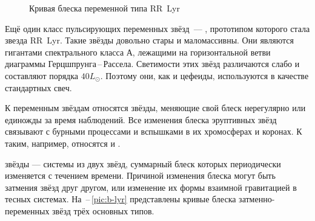 \begin{wrapfigure}[11]{r}{0.47\tw}
    \centering
    \vspace{-1.2pc}
    \caption{Кривая блеска переменной типа RR~Lyr} %
    \label{pic:light-curve-rr-lyr}
\end{wrapfigure}
Ещё один класс пульсирующих переменных звёзд~--- , прототипом которого стала звезда RR~Lyr. Такие звёзды довольно стары и маломассивны. Они являются гигантами спектрального класса А, лежащими на горизонтальной ветви диаграммы Герцшпрунга\,--\,Рассела. Светимости этих звёзд различаются слабо и составляют порядка $40L_\odot$. Поэтому они, как и цефеиды, используются в качестве стандартных свеч.

К  переменным звёздам относятся звёзды, меняющие свой блеск нерегулярно или единожды за время наблюдений. Все изменения блеска эруптивных звёзд связывают с бурными процессами и вспышками в их хромосферах и коронах. К таким, например, относятся  и .

 звёзды --- системы из двух звёзд, суммарный блеск которых периодически изменяется с течением времени. Причиной изменения блеска могут быть затмения звёзд друг другом, или изменение их формы взаимной гравитацией в тесных системах. На \,--\,\ref{pic:b-lyr}  представлены кривые блеска затменно-переменных звёзд трёх основных типов.

